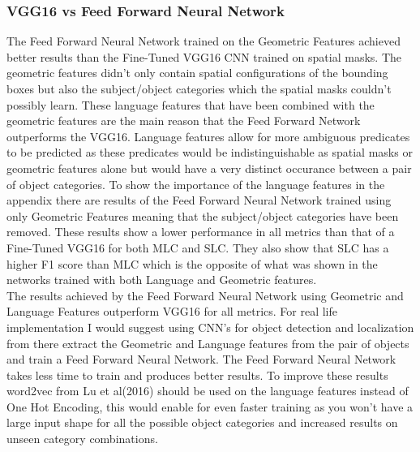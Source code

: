 \documentclass{csfyp}
\begin{document}
\subsubsection{VGG16 vs Feed Forward Neural Network}
The Feed Forward Neural Network trained on the Geometric Features achieved better results than the Fine-Tuned VGG16 CNN trained on spatial masks. The geometric features didn't only contain spatial configurations of the bounding boxes but also the subject/object categories which the spatial masks couldn't possibly learn. These language features that have been combined with the geometric features are the main reason that the Feed Forward Network outperforms the VGG16. Language features allow for more ambiguous predicates to be predicted as these predicates would be indistinguishable as spatial masks or geometric features alone but would have a very distinct occurance between a pair of object categories. To show the importance of the language features in the appendix there are results of the Feed Forward Neural Network trained using only Geometric Features meaning that the subject/object categories have been removed. These results show a lower performance in all metrics than that of a Fine-Tuned VGG16 for both MLC and SLC. They also show that SLC has a higher F1 score than MLC which is the opposite of what was shown in the networks trained with both Language and Geometric features.
\\
The results achieved by the Feed Forward Neural Network using Geometric and Language Features outperform VGG16 for all metrics. For real life implementation I would suggest using CNN's for object detection and localization from there extract the Geometric and Language features from the pair of objects and train a Feed Forward Neural Network. The Feed Forward Neural Network takes less time to train and produces better results. To improve these results word2vec from Lu et al(2016) should be used on the language features instead of One Hot Encoding, this would enable for even faster training as you won't have a large input shape for all the possible object categories and increased results on unseen category combinations.
\end{document}
